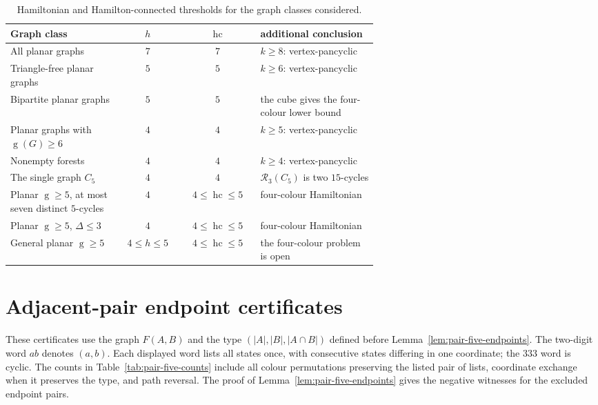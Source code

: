 \documentclass[11pt]{article}
\theoremstyle{remark}
\newcommand{\R}{\mathcal R}
\newcommand{\hc}{\operatorname{hc}}
\newcommand{\girth}{\operatorname{g}}
\numberwithin{equation}{section}
\numberwithin{table}{section}
\begin{document}
\begin{table}[htbp]
\centering\small
\setlength{\tabcolsep}{4pt}
\caption{Hamiltonian and Hamilton-connected thresholds for the graph classes considered.}
\label{tab:threshold-summary}
\renewcommand{\arraystretch}{1.18}
\begin{tabular}{p{0.30\linewidth}c c p{0.32\linewidth}}
\toprule
Graph class & $h$ & $\hc$ & additional conclusion\\
\midrule
All planar graphs & $7$ & $7$ & $k\ge8$: vertex-pancyclic\\
Triangle-free planar graphs & $5$ & $5$ & $k\ge6$: vertex-pancyclic\\
Bipartite planar graphs & $5$ & $5$ & the cube gives the four-colour lower bound\\
Planar graphs with $\girth(G)\ge6$ & $4$ & $4$ & $k\ge5$: vertex-pancyclic\\
Nonempty forests & $4$ & $4$ & $k\ge4$: vertex-pancyclic\\
The single graph $C_5$ & $4$ & $4$ & $\R_3(C_5)$ is two $15$-cycles\\
Planar $\girth\ge5$, at most seven distinct $5$-cycles & $4$ & $4\le\hc\le5$ & four-colour Hamiltonian\\
Planar $\girth\ge5$, $\Delta\le3$ & $4$ & $4\le\hc\le5$ & four-colour Hamiltonian\\
General planar $\girth\ge5$ & $4\le h\le5$ & $4\le\hc\le5$ & the four-colour problem is open\\
\bottomrule
\end{tabular}
\end{table}

\clearpage
\section{Adjacent-pair endpoint certificates}
\label{app:pair-five-certificates}
These certificates use the graph $F(A,B)$ and the type
$(|A|,|B|,|A\cap B|)$ defined before
Lemma~\ref{lem:pair-five-endpoints}. The two-digit word $ab$ denotes
$(a,b)$. Each displayed word lists all states once, with consecutive
states differing in one coordinate; the $333$ word is cyclic.
The counts in Table~\ref{tab:pair-five-counts} include all colour
permutations preserving the listed pair of lists, coordinate exchange
when it preserves the type, and path reversal. The proof of
Lemma~\ref{lem:pair-five-endpoints} gives the negative witnesses for the
excluded endpoint pairs.
\end{document}
